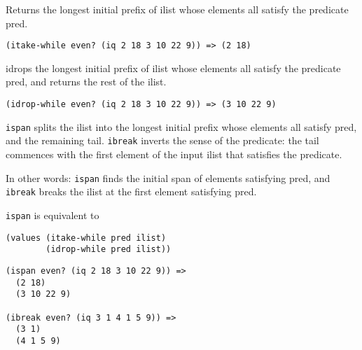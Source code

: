 \begin{entry}{%
  }

  Returns
  the longest initial prefix of ilist whose elements all satisfy the
  predicate pred.

\begin{verbatim}
(itake-while even? (iq 2 18 3 10 22 9)) => (2 18)
\end{verbatim}
\end{entry}

\begin{entry}{%
  }

  idrops
  the longest initial prefix of ilist whose elements all satisfy the
  predicate pred, and returns the rest of the ilist.

\begin{verbatim}
(idrop-while even? (iq 2 18 3 10 22 9)) => (3 10 22 9)
\end{verbatim}
\end{entry}

\begin{entry}{%
  }

  \texttt{ispan} splits the ilist into the longest initial prefix
  whose elements all satisfy pred, and the remaining
  tail. \texttt{ibreak} inverts the sense of the predicate: the tail
  commences with the first element of the input ilist that satisfies
  the predicate.

  In other words: \texttt{ispan} finds the initial span of elements
  satisfying pred, and \texttt{ibreak} breaks the ilist at the first
  element satisfying pred.

  \texttt{ispan} is equivalent to

\begin{verbatim}
(values (itake-while pred ilist) 
        (idrop-while pred ilist))
\end{verbatim}

\begin{verbatim}
(ispan even? (iq 2 18 3 10 22 9)) =>
  (2 18)
  (3 10 22 9)

(ibreak even? (iq 3 1 4 1 5 9)) =>
  (3 1)
  (4 1 5 9)
\end{verbatim}
\end{entry}

